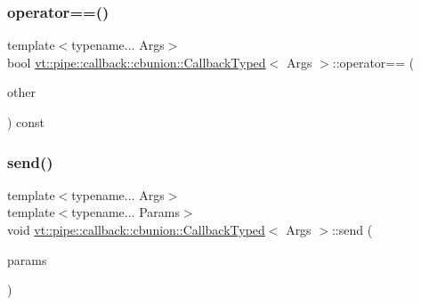 \mbox{\label{structvt_1_1pipe_1_1callback_1_1cbunion_1_1_callback_typed_ad6e3b2becf075db7375919d6072f12d2}} 
\subsubsection{\texorpdfstring{operator==()}{operator==()}\hspace{0.1cm}{\footnotesize\ttfamily [2/2]}}
{\footnotesize\ttfamily template$<$typename... Args$>$ \\
bool \hyperlink{structvt_1_1pipe_1_1callback_1_1cbunion_1_1_callback_typed}{vt\+::pipe\+::callback\+::cbunion\+::\+Callback\+Typed}$<$ Args $>$\+::operator== (\begin{DoxyParamCaption}\item[{\hyperlink{structvt_1_1pipe_1_1callback_1_1cbunion_1_1_callback_raw_base_single}{Callback\+Raw\+Base\+Single} const \&}]{other }\end{DoxyParamCaption}) const\hspace{0.3cm}{\ttfamily [inline]}}

\mbox{\label{structvt_1_1pipe_1_1callback_1_1cbunion_1_1_callback_typed_a7977d8ee9e8e28158865f0ad72ea91a4}} 
\subsubsection{\texorpdfstring{send()}{send()}\hspace{0.1cm}{\footnotesize\ttfamily [1/3]}}
{\footnotesize\ttfamily template$<$typename... Args$>$ \\
template$<$typename... Params$>$ \\
void \hyperlink{structvt_1_1pipe_1_1callback_1_1cbunion_1_1_callback_typed}{vt\+::pipe\+::callback\+::cbunion\+::\+Callback\+Typed}$<$ Args $>$\+::send (\begin{DoxyParamCaption}\item[{Params \&\&...}]{params }\end{DoxyParamCaption})\hspace{0.3cm}{\ttfamily [inline]}}

